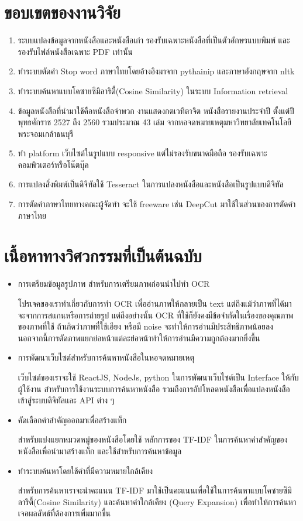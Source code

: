 \section{ขอบเขตของงานวิจัย}
\begin{enumerate}
    \item ระบบแปลงข้อมูลจากหนังสือและหนังสือเก่า รองรับเฉพาะหนังสือที่เป็นตัวอักษรแบบพิมพ์ และรองรับไฟล์หนังสือเฉพาะ PDF เท่านั้น
    \item ทำระบบตัดคำ Stop word ภาษาไทยโดยอ้างอิงมาจาก pythainip และภาษาอังกฤษจาก nltk
    \item ทำระบบค้นหาแบบโคซายซิมิลาริตี้(Cosine Similarity) ในระบบ Information retrieval
    \item ข้อมูลหนังสือที่นำมาใช้คือหนังสือจำพวก งานแสดงกตเวทิตาจิต หนังสือรายงานประจำปี ตั้งแต่ปีพุทธศักราช 2527 ถึง 2560 รวมประมาณ 43 เล่ม จากหอจดหมายเหตุมหาวิทยาลัยเทคโนโลยีพระจอมเกล้าธนบุรี
    \item ทำ platform เว็บไซต์ในรูปแบบ responsive แต่ไม่รองรับขนาดมือถือ รองรับเฉพาะคอมพิวเตอร์หรือโน๊ตบุ๊ค
    \item การแปลงสิ่งพิมพ์เป็นดิจิทัลใช้ Tesseract ในการแปลงหนังสือและหนังสือเป็นรูปแบบดิจิทัล
    \item การตัดคำภาษาไทยทางคณะผู้จัดทำ จะใช้ freeware เช่น DeepCut มาใช้ในส่วนของการตัดคำภาษาไทย
\end{enumerate}
\section{เนื้อหาทางวิศวกรรมที่เป็นต้นฉบับ}
\begin{itemize}
    \item การเตรียมข้อมูลรูปภาพ สำหรับการเตรียมภาพก่อนนำไปทำ OCR 
    
    โปรเจคของเราทำเกี่ยวกับการทำ OCR เพื่ออ่านภาพให้กลายเป็น text แต่ถึงแม้ว่าภาพที่ได้มาจะจากการสแกนหรือการถ่ายรูป แต่ถึงอย่างนั้น OCR ที่ใช้ก็ยังคงมีข้อจำกัดในเรื่องของคุณภาพของภาพที่ใช้ ถ้าเกิดว่าภาพที่ใช้เอียง หรือมี noise จะทำให้การอ่านมีประสิทธิภาพน้อยลง นอกจากนี้การตัดภาพแยกย่อหน้าแต่ละย่อหน้าทำให้การอ่านมีความถูกต้องมากยิ่งขึ้น

    \item การพัฒนาเว็บไซต์สำหรับการค้นหาหนังสือในหอจดหมายเหตุ
    
    เว็บไซต์ของเราจะใช้ ReactJS, NodeJs, python  ในการพัฒนาเว็บไซต์เป็น Interface ให้กับผู้ใช้งาน สำหรับการใช้งานระบบการค้นหาหนังสือ รวมถึงการอัปโหลดหนังสือเพื่อแปลงหนังสือเข้าสู่ระบบดิจิทัลและ API ต่าง ๆ
    
    \item คัดเลือกคำสำคัญออกมาเพื่อสร้างแท็ก 
    
    สำหรับแบ่งแยกหมวดหมู่ของหนังสือโดยใช้ หลักการของ TF-IDF ในการค้นหาคำสำคัญของหนังสือเพื่อนำมาสร้างแท็ก และใช้สำหรับการค้นหาข้อมูล
    
    \item ทำระบบค้นหาโดยใช้คำที่มีความหมายใกล้เคียง
    
    สำหรับการค้นหาเราจะนำคะแนน TF-IDF มาใช้เป็นคะแนนเพื่อใช้ในการค้นหาแบบโคซายซิมิลาริตี้(Cosine Similarity) และค้นหาคำใกล้เคียง (Query Expansion) เพื่อทำให้การค้นหาเจอผลลัพธ์ที่ต้องการเพิ่มมากขึ้น
    
\end{itemize}
